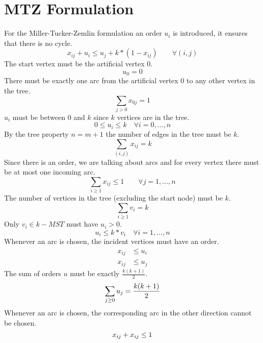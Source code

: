 \documentclass[a4paper]{article}
\numberwithin{equation}{section}
\begin{document}
\section{MTZ Formulation}
For the Miller-Tucker-Zemlin formulation an order $u_i$ is introduced, it ensures that there is no cycle.
\begin{equation}
x_{ij} + u_i \leq u_j + k*(1-x_{ij}) \qquad \forall (i,j)
\end{equation}
The start vertex must be the artificial vertex $0$.
\begin{equation}
	u_0=0
\end{equation}
There must be exactly one arc from the artificial vertex $0$ to any other vertex in the tree.
\begin{equation}
	\sum_{j>0} x_{0j} = 1
\end{equation}
$u_i$ must be between $0$ and $k$ since $k$ vertices are in the tree.
\begin{equation}
0\leq u_i \leq k \quad \forall i=0,\dots,n
\end{equation}
By the tree property $n=m+1$ the number of edges in the tree must be $k$.
\begin{equation}
	\sum_{(i,j)} x_{ij} = k
\end{equation}
Since there is an order, we are talking about arcs and for every vertex there must be at most one incoming arc.
\begin{equation}
	\sum_{i\geq 1} x_{ij}\leq 1 \qquad \forall j=1,\dots,n
\end{equation}
The number of vertices in the tree (excluding the start node) must be $k$.
\begin{equation}
	\sum_{i\geq 1}v_i=k
\end{equation}
Only $v_i \in k-MST$ must have $u_i>0$.
\begin{equation}
	u_i \leq k*v_i	\quad \forall i=1,\dots,n
\end{equation}
Whenever an arc is chosen, the incident vertices must have an order.
\begin{align}
	x_{ij} &\leq u_i \\
	x_{ij} &\leq u_j 
\end{align}
The sum of orders $u$ must be exactly $\frac{k(k+1)}{2}$.
\begin{equation}
	\sum_{j \geq 0} u_{j}=\frac{k(k+1)}{2} \\
\end{equation}
Whenever an arc is chosen, the corresponding arc in the other direction cannot be chosen.
\begin{equation}
	x_{ij} + x_{ij}\leq 1 \\
\end{equation}
\end{document}
